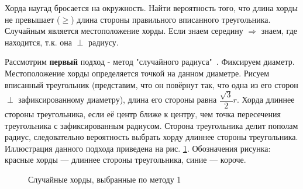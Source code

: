 \begin{exmp}
	Хорда наугад бросается на окружность. Найти вероятность того, что длина хорды не превышает ($\ge$) длина стороны правильного вписанного треугольника. Случайным является местоположение хорды. Если знаем середину $\Rightarrow$ знаем, где находится, т.к. она $\perp$ радиусу.
	
	Рассмотрим \textbf{первый} подход - метод "случайного радиуса"\ . Фиксируем диаметр. Местоположение хорды определяется точкой на данном диаметре. Рисуем вписанный треугольник (представим, что он повёрнут так, что одна из его сторон $\perp$ зафиксированному диаметру), длина его стороны равна $\dfrac{\sqrt{3}}{2} r$. Хорда длиннее стороны треугольника, если её центр ближе к центру, чем точка пересечения треугольника с зафиксированным радиусом. Сторона треугольника делит пополам радиус, следовательно вероятность выбрать хорду длиннее стороны треугольника. Иллюстрация данного подхода приведена на рис. \ref{img:bertrand1}. Обозначения рисунка: красные хорды — длиннее стороны треугольника, синие — короче.
	
	\begin{figure}[h]
		\caption{Случайные хорды, выбранные по методу 1}
		\label{img:bertrand1}
	\end{figure}
	

\end{exmp}

